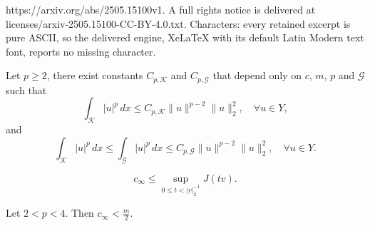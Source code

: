 \documentclass[10pt,a4paper]{amsart}
\newcommand{\G}{\mathcal{G}}
\newcommand{\K}{\mathcal{K}}
\newcommand{\abs}[1]{\lvert#1\rvert}
\newcommand{\norm}[1]{\lVert#1\rVert}
\begin{document}
https://arxiv.org/abs/2505.15100v1. A full rights notice is delivered at licenses/arxiv-2505.15100-CC-BY-4.0.txt. Characters: every retained excerpt is pure ASCII, so the delivered engine, XeLaTeX with its default Latin Modern text font, reports no missing character.
\begin{lemma}\label{lemgnsg}
Let $p \geq 2$, there exist constants $C_{p,\K}$ and $C_{p,\G}$ that depend only on $c$, $m$, $p$ and $\G$ such that
\[
    \int_{\K} \abs{u}^p\,dx \leq C_{p,\K} \norm{u}^{p-2}\norm{u}_2^{2}, \quad \forall u \in Y,
\]
and
\[
 \int_{\K} \abs{u}^p\,dx \leq \int_{\G} \abs{u}^p\,dx \leq C_{p,\G} \norm{u}^{p-2}\norm{u}_2^{2}, \quad \forall u \in Y.
\]
\end{lemma}

\begin{equation}\label{eqcssup}
    c_{\infty} \leq \sup _{0 \leq t<|v|_{2}^{-1}} J(t v).
\end{equation}

\begin{lemma}\label{lemcin}
    Let $2<p<4$. Then $c_\infty < \frac{m}{2}$.
\end{lemma}
\end{document}
